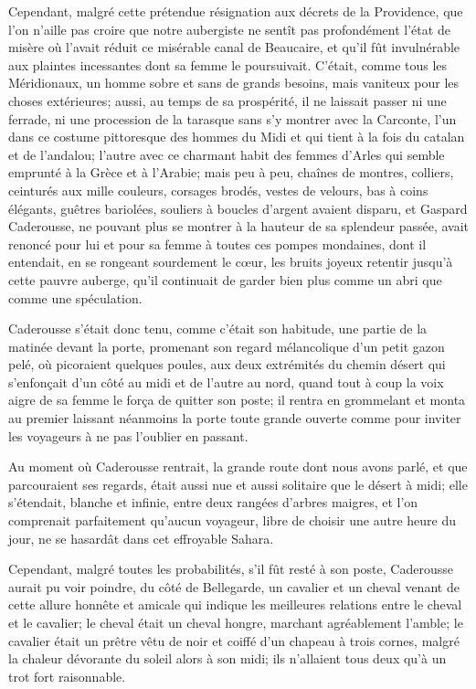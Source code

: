 Cependant, malgré cette prétendue résignation aux décrets de la Providence, que l'on n'aille pas croire que notre aubergiste ne sentît pas profondément l'état de misère où l'avait réduit ce misérable canal de Beaucaire, et qu'il fût invulnérable aux plaintes incessantes dont sa femme le poursuivait. C'était, comme tous les Méridionaux, un homme sobre et sans de grands besoins, mais vaniteux pour les choses extérieures; aussi, au temps de sa prospérité, il ne laissait passer ni une ferrade, ni une procession de la tarasque sans s'y montrer avec la Carconte, l'un dans ce costume pittoresque des hommes du Midi et qui tient à la fois du catalan et de l'andalou; l'autre avec ce charmant habit des femmes d'Arles qui semble emprunté à la Grèce et à l'Arabie; mais peu à peu, chaînes de montres, colliers, ceinturés aux mille couleurs, corsages brodés, vestes de velours, bas à coins élégants, guêtres bariolées, souliers à boucles d'argent avaient disparu, et Gaspard Caderousse, ne pouvant plus se montrer à la hauteur de sa splendeur passée, avait renoncé pour lui et pour sa femme à toutes ces pompes mondaines, dont il entendait, en se rongeant sourdement le cœur, les bruits joyeux retentir jusqu'à cette pauvre auberge, qu'il continuait de garder bien plus comme un abri que comme une spéculation.

Caderousse s'était donc tenu, comme c'était son habitude, une partie de la matinée devant la porte, promenant son regard mélancolique d'un petit gazon pelé, où picoraient quelques poules, aux deux extrémités du chemin désert qui s'enfonçait d'un côté au midi et de l'autre au nord, quand tout à coup la voix aigre de sa femme le força de quitter son poste; il rentra en grommelant et monta au premier laissant néanmoins la porte toute grande ouverte comme pour inviter les voyageurs à ne pas l'oublier en passant.

Au moment où Caderousse rentrait, la grande route dont nous avons parlé, et que parcouraient ses regards, était aussi nue et aussi solitaire que le désert à midi; elle s'étendait, blanche et infinie, entre deux rangées d'arbres maigres, et l'on comprenait parfaitement qu'aucun voyageur, libre de choisir une autre heure du jour, ne se hasardât dans cet effroyable Sahara.

Cependant, malgré toutes les probabilités, s'il fût resté à son poste, Caderousse aurait pu voir poindre, du côté de Bellegarde, un cavalier et un cheval venant de cette allure honnête et amicale qui indique les meilleures relations entre le cheval et le cavalier; le cheval était un cheval hongre, marchant agréablement l'amble; le cavalier était un prêtre vêtu de noir et coiffé d'un chapeau à trois cornes, malgré la chaleur dévorante du soleil alors à son midi; ils n'allaient tous deux qu'à un trot fort raisonnable.

